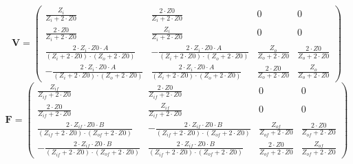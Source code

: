 \[ \mathbf{V}=\left(\begin{smallmatrix} \frac{Z_i}{Z_i+2\cdot Z0} &
\frac{2\cdot Z0}{Z_i+2\cdot Z0} & 0 & 0 \\ \frac{2\cdot Z0}{Z_i+2\cdot
Z0} & \frac{Z_i}{Z_i+2\cdot Z0} & 0 & 0 \\ \frac{2\cdot Z_i\cdot
Z0\cdot A}{ (Z_i+2\cdot Z0 )\cdot (Z_o+2\cdot Z0 )} & -\frac{2\cdot
Z_i\cdot Z0\cdot A}{ (Z_i+2\cdot Z0 )\cdot (Z_o+2\cdot Z0 )} &
\frac{Z_o}{Z_o+2\cdot Z0} & \frac{2\cdot Z0}{Z_o+2\cdot Z0} \\
-\frac{2\cdot Z_i\cdot Z0\cdot A}{ (Z_i+2\cdot Z0 )\cdot (Z_o+2\cdot
Z0 )} & \frac{2\cdot Z_i\cdot Z0\cdot A}{ (Z_i+2\cdot Z0 )\cdot
(Z_o+2\cdot Z0 )} & \frac{2\cdot Z0}{Z_o+2\cdot Z0} &
\frac{Z_o}{Z_o+2\cdot Z0} \end{smallmatrix}\right) \]
\[ \mathbf{F}=\left(\begin{smallmatrix} \frac{Z_{if}}{Z_{if}+2\cdot
Z0} & \frac{2\cdot Z0}{Z_{if}+2\cdot Z0} & 0 & 0 \\ \frac{2\cdot
Z0}{Z_{if}+2\cdot Z0} & \frac{Z_{if}}{Z_{if}+2\cdot Z0} & 0 & 0 \\
\frac{2\cdot Z_{if}\cdot Z0\cdot B}{ (Z_{if}+2\cdot Z0 )\cdot
(Z_{of}+2\cdot Z0 )} & -\frac{2\cdot Z_{if}\cdot Z0\cdot B}{
(Z_{if}+2\cdot Z0 )\cdot (Z_{of}+2\cdot Z0 )} &
\frac{Z_{of}}{Z_{of}+2\cdot Z0} & \frac{2\cdot Z0}{Z_{of}+2\cdot Z0}
\\ -\frac{2\cdot Z_{if}\cdot Z0\cdot B}{ (Z_{if}+2\cdot Z0 )\cdot
(Z_{of}+2\cdot Z0 )} & \frac{2\cdot Z_{if}\cdot Z0\cdot B}{
(Z_{if}+2\cdot Z0 )\cdot (Z_{of}+2\cdot Z0 )} & \frac{2\cdot
Z0}{Z_{of}+2\cdot Z0} & \frac{Z_{of}}{Z_{of}+2\cdot Z0}
\end{smallmatrix}\right) \]
